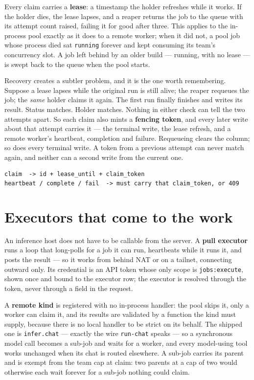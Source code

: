 \documentclass[11pt,a4paper]{report}
\begin{document}
Every claim carries a \textbf{lease}: a timestamp the holder refreshes while it works. If the holder dies, the lease lapses, and a reaper returns the job to the queue with its attempt count raised, failing it for good after three. This applies to the in-process pool exactly as it does to a remote worker; when it did not, a pool job whose process died sat \texttt{running} forever and kept consuming its team's concurrency slot. A job left behind by an older build --- running, with no lease --- is swept back to the queue when the pool starts.

Recovery creates a subtler problem, and it is the one worth remembering. Suppose a lease lapses while the original run is still alive; the reaper requeues the job; the \emph{same} holder claims it again. The first run finally finishes and writes its result. Status matches. Holder matches. Nothing in either check can tell the two attempts apart. So each claim also mints a \textbf{fencing token}, and every later write about that attempt carries it --- the terminal write, the lease refresh, and a remote worker's heartbeat, completion and failure. Requeueing clears the column; so does every terminal write. A token from a previous attempt can never match again, and neither can a second write from the current one.

\begin{lstlisting}
claim  -> id + lease_until + claim_token
heartbeat / complete / fail  -> must carry that claim_token, or 409
\end{lstlisting}

\section{Executors that come to the work}

An inference host does not have to be callable from the server. A \textbf{pull executor} runs a loop that long-polls for a job it can run, heartbeats while it runs it, and posts the result --- so it works from behind NAT or on a tailnet, connecting outward only. Its credential is an API token whose only scope is \texttt{jobs:execute}, shown once and bound to the executor row; the executor is resolved through the token, never through a field in the request.

A \textbf{remote kind} is registered with no in-process handler: the pool skips it, only a worker can claim it, and its results are validated by a function the kind must supply, because there is no local handler to be strict on its behalf. The shipped one is \texttt{infer.chat} --- exactly the wire \texttt{run-chat} speaks --- so a synchronous model call becomes a sub-job and waits for a worker, and every model-using tool works unchanged when its chat is routed elsewhere. A sub-job carries its parent and is exempt from the team cap at claim: two parents at a cap of two would otherwise each wait forever for a sub-job nothing could claim.
\end{document}
